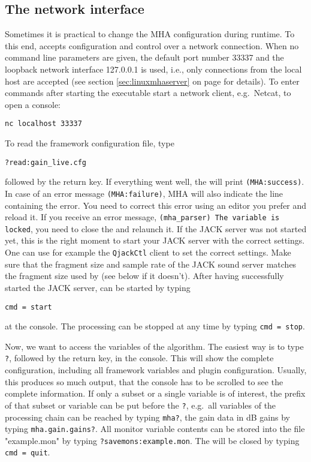 \subsection{The \mha{} network interface}%
\label{sec:example_network}%
%
%
Sometimes it is practical to change the MHA configuration during runtime. To
this end, \mha{} accepts configuration and control over a network connection.
%
When no command line parameters are given, the default port number
33337 and the loopback network interface 127.0.0.1 is used, i.e., only
connections from the local host are accepted (see section
\ref{sec:linuxmhaserver} on page \pageref{sec:linuxmhaserver} for
details).
%
To enter \mha{} commands after starting the \mha{} executable
start a network client, e.g.\ Netcat, to
open a \mha{} console:
\begin{verbatim}nc localhost 33337\end{verbatim}

To read the framework configuration file, type
\begin{verbatim}
?read:gain_live.cfg
\end{verbatim}
followed by the return key. If everything went well, the \mha{} will print
\verb!(MHA:success)!. In case of an error message \verb!(MHA:failure)!, MHA 
will also indicate the line containing the error. You need to correct this 
error using an editor you prefer and  reload it. If you receive an error 
message, \verb!(mha_parser) The variable is locked!, you need to close the 
\mhad{} and relaunch it. If the JACK server was not started yet, this is the
right moment to start your JACK server with the correct settings. One can use 
for example the \verb!QjackCtl! client to set the correct settings.
Make sure that the fragment size and sample rate of the JACK
sound server matches the fragment size used by \mha{} (see below if it
doesn't). After having successfully started the JACK server, \mha{}
can be started by typing
\begin{verbatim}
cmd = start
\end{verbatim}
at the \mha{} console. The processing can be stopped at any time by
typing \verb!cmd = stop!.

Now, we want to access the variables of the algorithm. The easiest way
is to type \verb!?!, followed by the return key, in the console. This
will show the complete \mha{} configuration, including all framework
variables and plugin configuration. Usually, this
produces so much output, that the console has to be scrolled to see
the complete information. If only a subset or a single variable is of
interest, the prefix of that subset or variable can be put before the
\verb!?!, e.g.\ all variables of the processing chain can be reached
by typing \newline\verb!mha?!, the gain data in dB gains
by typing \newline\verb!mha.gain.gains?!. All monitor variable contents can
be stored into the file "example.mon" by typing
\verb!?savemons:example.mon!. The \mhad{} will be closed
by typing \verb!cmd = quit!.

